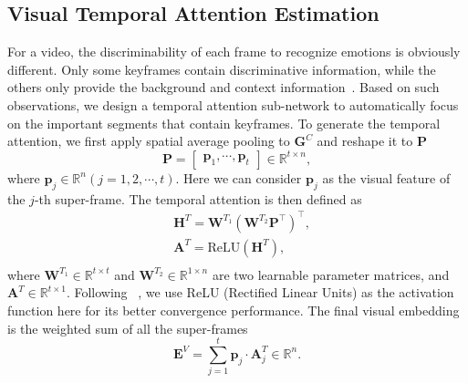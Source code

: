 \documentclass[letterpaper]{article} \usepackage{aaai20}  \usepackage{times}  \usepackage{helvet} \usepackage{courier}  \usepackage[hyphens]{url}  \usepackage{graphicx} \urlstyle{rm} \def\UrlFont{\rm}  \usepackage{graphicx}
\begin{document}
\subsection{Visual Temporal Attention Estimation}
For a video, the discriminability of each frame to recognize emotions is obviously different. Only some keyframes contain discriminative information, while the others only provide the background and context information~\cite{song2017end}. Based on such observations, we design a temporal attention sub-network to automatically focus on the important segments that contain keyframes. To generate the temporal attention, we first apply spatial average pooling to $\textbf{G}^C$ and reshape it to $\textbf{P}$
\begin{equation}\textbf{P} = [\begin{array}{*{20}{c}}
{{\textbf{p}_1},} \cdots {,{\textbf{p}_t}}
\end{array}] \in {\mathbb{R}^{t \times n}},
\end{equation}
where $\textbf{p}_j \in \mathbb{R}^{n}(j = 1,2, \cdots ,t)$. Here we can consider $\textbf{p}_j$ as the visual feature of the $j$-th super-frame. The temporal attention is then defined as
\begin{equation}\begin{aligned}
&{\textbf{H}^T} = {\textbf{W}^{T_1}}{({\textbf{W}^{T_2}}{\textbf{P}^ \top})^ \top },\\
&\textbf{A}^T=\text{ReLU}(\textbf{H}^T),\\
\end{aligned}
\end{equation}
where $\textbf{W}^{T_1}\in\mathbb{R}^{t\times t}$ and $\textbf{W}^{T_2}\in\mathbb{R}^{1\times n}$ are two learnable parameter matrices, and $\textbf{A}^T \in \mathbb{R}^{ t \times 1}$. Following ~\cite{song2017end}, we use ReLU (Rectified Linear Units) as the activation function here for its better convergence performance. The final visual embedding is the weighted sum of all the super-frames
\begin{equation}{\textbf{E}^V} = \sum\limits_{j = 1}^t {{\textbf{p}_j} \cdot \textbf{A}_j^T}\in \mathbb{R}^{n}.
\end{equation}
\end{document}
